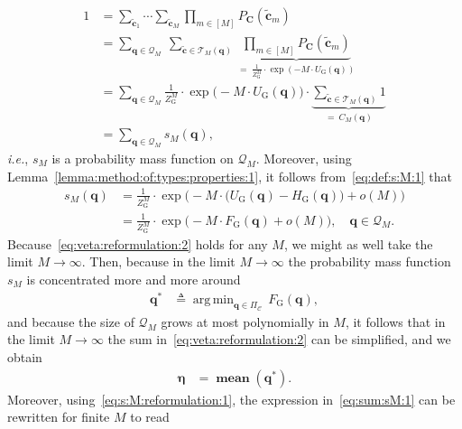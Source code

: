 \documentclass[journal, twocolumn]{IEEEtran}
\renewcommand{\mathbf}[1]{{\bm{#1}}}
\newcommand{\ie}{\emph{i.e.}}
\newcommand{\vect}[1]{\mathbf{#1}}
\newcommand{\code}[1]{\mathcal{#1}}
\newcommand{\set}[1]{\mathcal{#1}}
\DeclareMathOperator*{\argmin}{arg\,min}
\newcommand{\defeq}{\triangleq}
\newcommand{\codeCedge}{\code{C}}
\newcommand{\veta}{\boldsymbol{\eta}}
\newcommand{\vC}{\vect{C}}
\newcommand{\vq}{\vect{q}}
\newcommand{\?}{\mathrm{?}}
\newcommand{\meanvect}{\operatorname{\mathbf{mean}}}
\newcommand{\tvc}{\vect{\tilde{c}}}
\newcommand{\vcsample}[1]{\tvc_{#1}}
\newcommand{\vcsampletot}{\tvc}
\newcommand{\setQsample}[1]{\set{Q}_{#1}}
\newcommand{\FGibbs}{F_{\mathrm{G}}}
\newcommand{\UGibbs}{U_{\mathrm{G}}}
\newcommand{\HGibbs}{H_{\mathrm{G}}}
\newcommand{\ZGibbs}{Z_{\mathrm{G}}}
\newcommand{\setPi}{\Pi}
\begin{document}
\begin{align}
  1
    &= \sum_{\vcsample{1}}
       \cdots
       \sum_{\vcsample{M}}
         \prod_{m \in [M]}
           P_{\vC}(\vcsample{m}) \nonumber \\
    &= \sum_{\vq \in \setQsample{M}} \
         \sum_{\vcsampletot \in \set{T}_M(\vq)} \
           \underbrace{
             \prod_{m \in [M]}
               P_{\vC}(\vcsample{m})
           }_{= \ \frac{1}{\ZGibbs^M} \cdot \exp(-M \cdot \UGibbs(\vq))}
             \nonumber \\
    &= \sum_{\vq \in \setQsample{M}}
         \frac{1}{\ZGibbs^M}
         \cdot
         \exp\big( -M \cdot \UGibbs(\vq) \big)
         \cdot
         \underbrace{
           \sum_{\vcsampletot \in \set{T}_M(\vq)}
             1
         }_{= \ C_M(\vq)} \nonumber \\
    &= \sum_{\vq \in \setQsample{M}}
         s_M(\vq),
           \label{eq:sum:sM:1}
\end{align}
\ie, $s_M$ is a probability mass function on $\setQsample{M}$. Moreover, using
Lemma~\ref{lemma:method:of:types:properties:1}, it follows
from~\eqref{eq:def:s:M:1} that
\begin{align}
  s_M(\vq)
    &= \frac{1}{\ZGibbs^M}
       \cdot 
       \exp
         \Big(
           - M \cdot \big( \UGibbs(\vq) - \HGibbs(\vq) \big)
           + o(M)
         \Big) \nonumber \\
    &= \frac{1}{\ZGibbs^M}
       \cdot 
       \exp
         \big(
           - M \cdot \FGibbs(\vq)
           + o(M)
         \big),
           \quad \vq \in \setQsample{M}.
             \label{eq:s:M:reformulation:1}
\end{align}
Because~\eqref{eq:veta:reformulation:2} holds for any $M$, we might as well
take the limit $M \to \infty$. Then, because in the limit $M \to \infty$ the
probability mass function $s_M$ is concentrated more and more around
\begin{align*}
  \vq^{*}
    &\defeq
       \argmin_{\vq \in \setPi_{\codeCedge}} \, 
         \FGibbs(\vq),
\end{align*}
and because the size of $\setQsample{M}$ grows at most polynomially in $M$, it
follows that in the limit $M \to \infty$ the sum
in~\eqref{eq:veta:reformulation:2} can be simplified, and we obtain
\begin{align*}
  \veta
    &= \meanvect(\vq^{*}).
\end{align*}
Moreover, using~\eqref{eq:s:M:reformulation:1}, the expression
in~\eqref{eq:sum:sM:1} can be rewritten for finite $M$ to read
\end{document}
